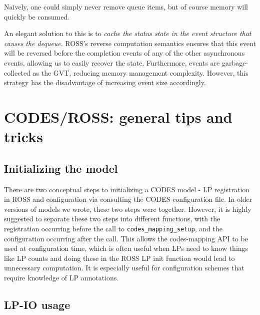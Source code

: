 \documentclass[conference,10pt,compsocconf,onecolumn]{IEEEtran}
\begin{document}
Naively, one could simply never remove queue items, but of course memory will
quickly be consumed.

An elegant solution to this is to \emph{cache the status state in the event
structure that causes the dequeue}. ROSS's reverse computation semantics ensures
that this event will be reversed before the completion events of any of the
other asynchronous events, allowing us to easily recover the state. Furthermore,
events are garbage-collected as the GVT, reducing memory management complexity.
However, this strategy has the disadvantage of increasing event size
accordingly.

\section{CODES/ROSS: general tips and tricks}

\subsection{Initializing the model}

There are two conceptual steps to initializing a CODES model - LP registration
in ROSS and configuration via consulting the CODES configuration file. In older
versions of models we wrote, these two steps were together. However, it is
highly suggested to separate these two steps into different functions, with the
registration occurring before the call to \texttt{codes\_mapping\_setup}, and
the configuration occurring after the call. This allows the codes-mapping API
to be used at configuration time, which is often useful when LPs need to know
things like LP counts and doing these in the ROSS LP init function would lead
to unnecessary computation. It is especially useful for configuration schemes
that require knowledge of LP annotations.

\subsection{LP-IO usage}
\end{document}
